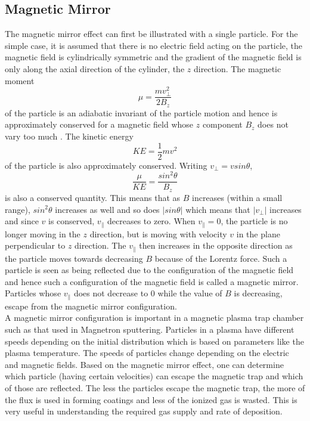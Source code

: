 \documentclass[12pt]{article}
\begin{document}
	\subsection{Magnetic Mirror}
	The magnetic mirror effect can first be illustrated with a 	single particle. For the simple case, it is assumed that there is no electric field acting on the particle, the magnetic field is cylindrically symmetric and the gradient of the magnetic field is only along the axial direction of the cylinder, the $z$ direction.  The magnetic moment $$\mu = \frac{m v_{\perp}^{2}}{2B_{z}} $$ of the particle is an adiabatic invariant of the particle motion and hence is approximately conserved for a magnetic field whose $z$ component $B_{z}$ does not vary too much . The kinetic energy$$ KE = \frac{1}{2}m v^{2}$$ of the particle is also approximately conserved. Writing $v_{\perp} = v sin \theta$,
	$$\frac{\mu}{KE} = \frac{sin^{2}\theta}{B_{z}}$$ is also a conserved quantity. This means that as $B$ increases (within a small range), $sin^{2}\theta$ increases as well and so does $|sin\theta|$ which means that $|v_{\perp}|$ increases and since $v$ is conserved, $v_{\parallel}$ decreases to zero. When $v_{\parallel} = 0$, the particle is no longer moving in the $z$ direction, but is moving with velocity $v$ in the plane perpendicular to $z$ direction. The $v_{\parallel}$ then increases in the opposite direction as the particle moves towards decreasing $B$ because of the Lorentz force. Such a particle is seen as being reflected due to the configuration of the magnetic field and hence such a configuration of the magnetic field is called a magnetic mirror. Particles whose $v_{\parallel}$ does not decrease to 0 while the value of $B$ is decreasing, escape from the magnetic mirror configuration. \\
	
	\noindent A magnetic mirror configuration is important in a magnetic plasma trap chamber such as that used in Magnetron sputtering. Particles in a plasma have different speeds depending on the initial distribution which is based on parameters like the plasma temperature. The speeds of particles change depending on the electric and magnetic fields. Based on the magnetic mirror effect, one can determine which particle (having certain velocities) can escape the magnetic trap and which of those are reflected. The less the particles escape the magnetic trap, the more of the flux is used in forming coatings and less of the ionized gas is wasted. This is very useful in understanding the required gas supply and rate of deposition.
	
\end{document}
